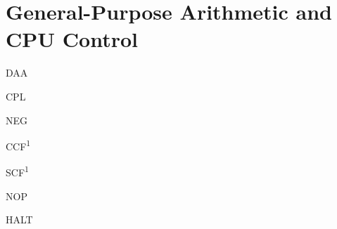 \documentclass[twoside,openright,a4paper]{book}
\newcommand{\See}[1]{\textsuperscript{#1}}
\begin{document}
\section{General-Purpose Arithmetic and CPU Control}

\begin{minipage}{\textwidth}

\begin{instrtable}

	\begin{instruction}{DAA}
	\end{instruction}

	\begin{instruction}{CPL} 
	\end{instruction}

	\begin{instruction}{NEG} 
		\SkipToOpCode 
	\end{instruction}

	\begin{instruction}{CCF\See{1}} 
			\Flags{\FN}{\FN}{\FS\See{2}}{\FN}{0}{\FS}
	\end{instruction}

	\begin{instruction}{SCF\See{1}} 
	\end{instruction}

	\begin{instruction}{NOP}
		\Symbol{}
			\Flags{\FN}{\FN}{\FN}{\FN}{\FN}{\FN}
	\end{instruction}

	\begin{instruction}{HALT}
			\Flags{\FN}{\FN}{\FN}{\FN}{\FN}{\FN}
	\end{instruction}


\end{instrtable}
\end{minipage}
\end{document}
